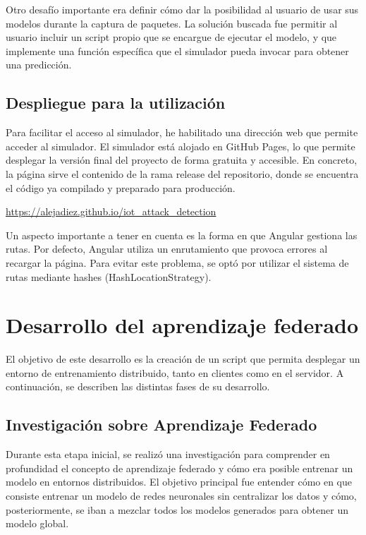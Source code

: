 Otro desafío importante era definir cómo dar la posibilidad al usuario de usar sus modelos durante la captura de paquetes. La solución buscada fue permitir al usuario incluir un script propio que se encargue de ejecutar el modelo, y que implemente una función específica que el simulador pueda invocar para obtener una predicción.

\subsection{Despliegue para la utilización}
\label{subsec:Despliegue}
Para facilitar el acceso al simulador, he habilitado una dirección web que permite acceder al simulador. El simulador está alojado en GitHub Pages, lo que permite desplegar la versión final del proyecto de forma gratuita y accesible. En concreto, la página sirve el contenido de la rama release del repositorio, donde se encuentra el código ya compilado y preparado para producción.

\url{https://alejadiez.github.io/iot_attack_detection}

Un aspecto importante a tener en cuenta es la forma en que Angular gestiona las rutas. Por defecto, Angular utiliza un enrutamiento que provoca errores al recargar la página. Para evitar este problema, se optó por utilizar el sistema de rutas mediante hashes (HashLocationStrategy).

\section{Desarrollo del aprendizaje federado}
\label{sec:DesarrolloAprendizajeFederado}
El objetivo de este desarrollo es la creación de un script que permita desplegar un entorno de entrenamiento distribuido, tanto en clientes como en el servidor. A continuación, se describen las distintas fases de su desarrollo.

\subsection{Investigación sobre Aprendizaje Federado}
\label{subsec:InvestigacionAprendizajeFederado}
Durante esta etapa inicial, se realizó una investigación para comprender en profundidad el concepto de aprendizaje federado y cómo era posible entrenar un modelo en entornos distribuidos. El objetivo principal fue entender cómo en que consiste entrenar un modelo de redes neuronales sin centralizar los datos y cómo, posteriormente, se iban a mezclar todos los modelos generados para obtener un modelo global.

